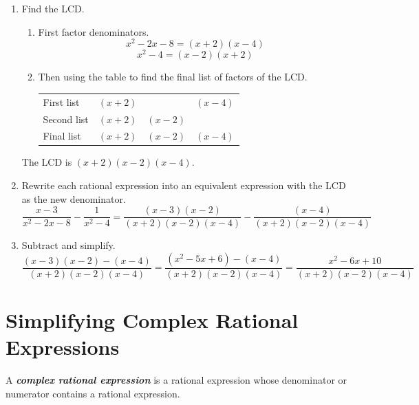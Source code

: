 \documentclass[
  en,11pt]{elegantbook}
\providecommand{\tightlist}{%
  \setlength{\itemsep}{0pt}\setlength{\parskip}{0pt}}
\begin{document}
\begin{solution}



\begin{enumerate}
\def\labelenumi{\arabic{enumi}.}
\tightlist
\item
  Find the LCD.

  \begin{enumerate}
  \def\labelenumii{\arabic{enumii}.}
  \item
    First factor denominators.\\
    \[x^2-2x-8=(x+2)(x-4)\]
    \[x^2-4=(x-2)(x+2)\]
  \item
    Then using the table to find the final list of factors of the LCD.

    \begin{longtable}[]{@{}lccc@{}}
    \toprule\noalign{}
    \endhead
    \bottomrule\noalign{}
    \endlastfoot
    First list & \((x+2)\) & & \((x-4)\) \\
    Second list & \((x+2)\) & \((x-2)\) & \\
    Final list & \((x+2)\) & \((x-2)\) & \((x-4)\) \\
    \end{longtable}
  \end{enumerate}

  The LCD is \((x+2)(x-2)(x-4)\).
\item
  Rewrite each rational expression into an equivalent expression with the LCD as the new denominator.\\
  \[
       \dfrac{x-3}{x^2-2x-8}- \dfrac{1}{x^2-4}=\dfrac{(x-3)(x-2)}{(x+2)(x-2)(x-4)}-\dfrac{(x-4)}{(x+2)(x-2)(x-4)}
   \]
\item
  Subtract and simplify.\\
  \[
       \dfrac{(x-3)(x-2)-(x-4)}{(x+2)(x-2)(x-4)}=\dfrac{(x^2-5x+6)-(x-4)}{(x+2)(x-2)(x-4)}=\dfrac{x^2-6x+10}{(x+2)(x-2)(x-4)}
   \]
\end{enumerate}

\end{solution}

\hypertarget{simplifying-complex-rational-expressions}{%
\section{Simplifying Complex Rational Expressions}\label{simplifying-complex-rational-expressions}}

A \textbf{\emph{complex rational expression}} is a rational expression whose denominator or numerator contains a rational expression.
\end{document}
